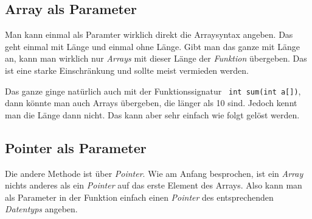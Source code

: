 \documentclass[c_worksheet.tex]{subfiles}
\begin{document}
\subsection{Array als Parameter} 

Man kann einmal als Paramter wirklich direkt die Arraysyntax angeben. Das geht einmal mit Länge und einmal ohne Länge. Gibt man das ganze mit Länge an, kann man wirklich nur \emph{Arrays} mit dieser Länge der \emph{Funktion} übergeben. Das ist eine starke Einschränkung und sollte meist vermieden werden.



Das ganze ginge natürlich auch mit der Funktionssignatur \lstinline$ int sum(int a[])$, dann könnte man auch Arrays übergeben, die länger als 10 sind. Jedoch kennt man die Länge dann nicht. Das kann aber sehr einfach wie folgt gelöst werden.
 


\subsection{Pointer als Parameter}

Die andere Methode ist über \emph{Pointer}. Wie am Anfang besprochen, ist ein \emph{Array} nichts anderes als ein \emph{Pointer} auf das erste Element des Arrays. Also kann man als Parameter in der Funktion einfach einen \emph{Pointer} des entsprechenden \emph{Datentyps} angeben.

 
\end{document}
